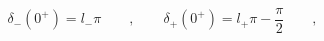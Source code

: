 \begin{equation}
\delta_-(0^+)=l_-\pi \qquad , \qquad
\delta_+(0^+)=l_+\pi-\frac{\pi}{2} \qquad , \label{eq:Levi}
\end{equation}

